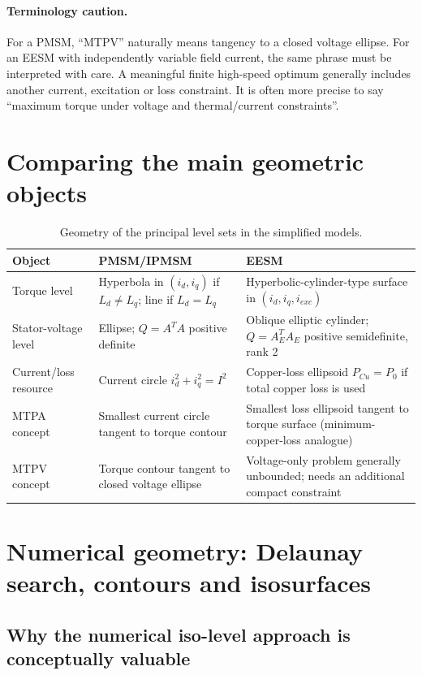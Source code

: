 \documentclass[11pt,a4paper]{article}
\begin{document}
\paragraph{Terminology caution.}
For a PMSM, ``MTPV'' naturally means tangency to a closed voltage ellipse. For an EESM with independently variable field current, the same phrase must be interpreted with care. A meaningful finite high-speed optimum generally includes another current, excitation or loss constraint. It is often more precise to say ``maximum torque under voltage and thermal/current constraints''.

\section{Comparing the main geometric objects}

\begin{table}[htbp]
\centering
\caption{Geometry of the principal level sets in the simplified models.}
\begin{tabular}{p{}p{}p{}}
\toprule
Object & PMSM/IPMSM & EESM\\
\midrule
Torque level & Hyperbola in $(i_d,i_q)$ if $L_d\neq L_q$; line if $L_d=L_q$ & Hyperbolic-cylinder-type surface in $(i_d,i_q,i_{exc})$\\[0.4em]
Stator-voltage level & Ellipse; $Q=A^TA$ positive definite & Oblique elliptic cylinder; $Q=A_E^TA_E$ positive semidefinite, rank 2\\[0.4em]
Current/loss resource & Current circle $i_d^2+i_q^2=I^2$ & Copper-loss ellipsoid $P_{Cu}=P_0$ if total copper loss is used\\[0.4em]
MTPA concept & Smallest current circle tangent to torque contour & Smallest loss ellipsoid tangent to torque surface (minimum-copper-loss analogue)\\[0.4em]
MTPV concept & Torque contour tangent to closed voltage ellipse & Voltage-only problem generally unbounded; needs an additional compact constraint\\
\bottomrule
\end{tabular}
\end{table}

\section{Numerical geometry: Delaunay search, contours and isosurfaces}

\subsection{Why the numerical iso-level approach is conceptually valuable}
\end{document}
